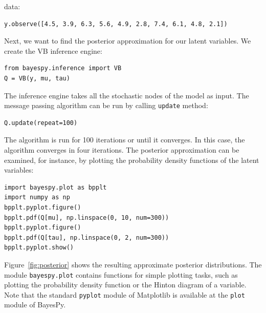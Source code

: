 \documentclass[twoside,11pt]{article}
\begin{document}
data:
\begin{lstlisting}
y.observe([4.5, 3.9, 6.3, 5.6, 4.9, 2.8, 7.4, 6.1, 4.8, 2.1])
\end{lstlisting}
Next, we want to find the posterior approximation for our latent variables.  We
create the VB inference engine:
\begin{lstlisting}
from bayespy.inference import VB
Q = VB(y, mu, tau)
\end{lstlisting}
The inference engine takes all the stochastic nodes of the model as input.  The
message passing algorithm can be run by calling \texttt{update} method:
\begin{lstlisting}
Q.update(repeat=100)
\end{lstlisting}
The algorithm is run for 100 iterations or until it converges.  In this case,
the algorithm converges in four iterations.  The posterior approximation can be
examined, for instance, by plotting the probability density functions of the
latent variables:
\begin{lstlisting}
import bayespy.plot as bpplt
import numpy as np
bpplt.pyplot.figure()
bpplt.pdf(Q[mu], np.linspace(0, 10, num=300))
bpplt.pyplot.figure()
bpplt.pdf(Q[tau], np.linspace(0, 2, num=300))
bpplt.pyplot.show()
\end{lstlisting}
Figure~\ref{fig:posterior} shows the resulting approximate posterior
distributions.  The module \texttt{bayespy.plot} contains functions for simple
plotting tasks, such as plotting the probability density function or the Hinton
diagram of a variable.  Note that the standard \texttt{pyplot} module of
Matplotlib is available at the \texttt{plot} module of BayesPy.
\end{document}
